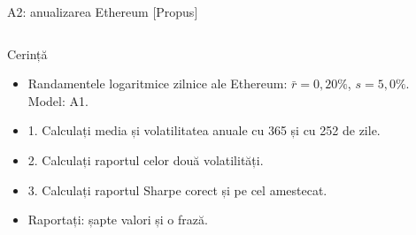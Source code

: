 \begin{frame}{A2: anualizarea Ethereum [Propus]}
\propsub
\itemsize{\scriptsize}
\begin{columns}[T]
\begin{column}{\taskw}
\begin{block}{Cerință}
\begin{itemize}
    \item Randamentele logaritmice zilnice ale Ethereum: $\bar r = 0{,}20\%$, $s = 5{,}0\%$. Model: A1.
    \item 1. Calculați media și volatilitatea anuale cu 365 și cu 252 de zile.
    \item 2. Calculați raportul celor două volatilități.
    \item 3. Calculați raportul Sharpe corect și pe cel amestecat.
    \item Raportați: șapte valori și o frază.
\end{itemize}
\end{block}
\end{column}
\begin{column}{\solw}
\end{column}
\end{columns}
\end{frame}

